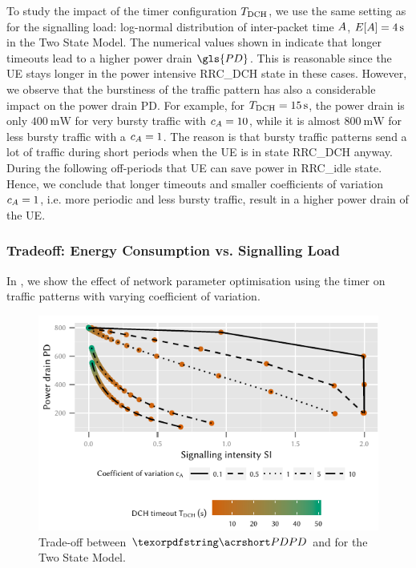 To study the impact of the timer configuration \(T_{\text{DCH}}\), we use the same setting as for the signalling load: log-normal distribution of inter-packet time \(A\), \(E[A] = \SI{4}{\second}\) in the Two State Model.
The numerical values shown in  indicate that longer timeouts lead to a higher power drain \(\gls{PD}\).
This is reasonable since the UE stays longer in the power intensive \gls{RRC_DCH} state in these cases.
However, we observe that the burstiness of the traffic pattern has also a considerable impact on the power drain \gls{PD}.
For example, for \(T_{\text{DCH}} = \SI{15}{\second}\), the power drain is only \(\SI{400}{\milli\watt}\) for very bursty traffic with \(c_{A} = 10\), while it is almost \(\SI{800}{\milli\watt}\) for less bursty traffic with a \(c_{A} = 1\).
The reason is that bursty traffic patterns send a lot of traffic during short periods when the UE is in state \gls{RRC_DCH} anyway. During the following off-periods that \gls{UE} can save power in \gls{RRC_idle} state.
Hence, we conclude that longer timeouts and smaller coefficients of variation \(c_{A} = 1\), i.e. more periodic and less bursty traffic, result in a higher power drain of the \gls{UE}.

\subsubsection*{Tradeoff: Energy Consumption vs. Signalling Load}\label{sec:network:performance_model:trade_off}
In , we show the effect of network parameter optimisation using the timer \TDCH on traffic patterns with varying coefficient of variation.

\begin{figure}
	\centering
	\includegraphics{network/performance_model/numerical_examples/figures/2state_pd_vs_si_vs_tdch}
	\caption{Trade-off between \(\headershortacr{PD}\) and  for the Two State Model.}
	\label{fig:network:performance_model:numerical_examples:validations:analytic_vs_simulation:2state_pd_vs_si_vs_tdch}
\end{figure}

